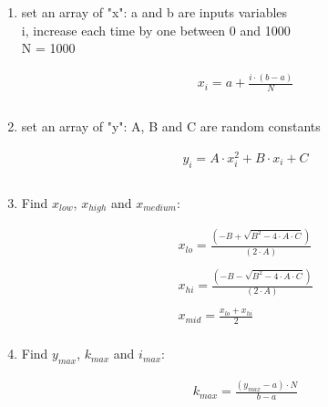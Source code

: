 \begin{enumerate} %

\item set an array of "x":
a and b are inputs variables \\
i, increase each time by one between 0 and 1000 \\
N = 1000

\begin{align*}
& x_i = a + \frac{i \cdot (b - a) }{N}  \\ \\
\end{align*}

\item set an array of "y":
A, B and C are random constants

\begin{align*}
& y_i = A \cdot x_i^2 + B \cdot x_i + C \\ \\
\end{align*}


\item Find $x_{low}$, $x_{high}$ and $x_{medium}$:

\begin{align*}
& x_{lo} = \frac{(-B + \sqrt{B^2 - 4 \cdot A \cdot C})}{(2 \cdot A)} \\ \\
& x_{hi} = \frac{(-B - \sqrt{B^2 - 4 \cdot A \cdot C})}{(2 \cdot A)} \\ \\
& x_{mid} = \frac{x_{lo} + x_{hi}}{2} \\
\end{align*}


\item Find $y_{max}$, $k_{max}$ and $i_{max}$:

\begin{align*}
& k_{max} = \frac{(y_{max} - a) \cdot N}{b - a}
\end{align*}




\end{enumerate}
